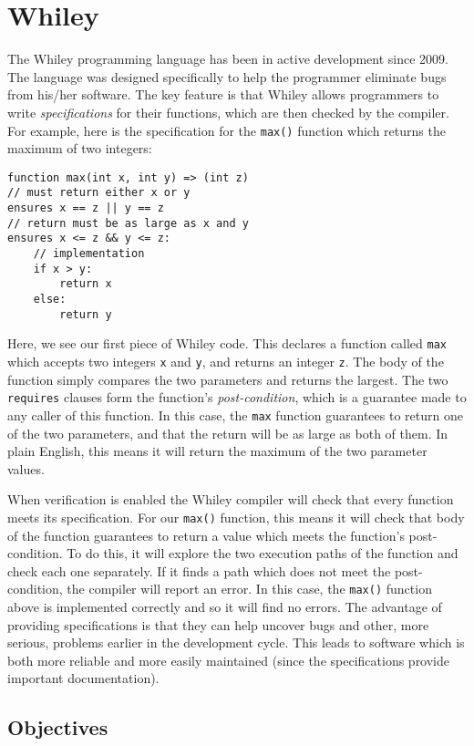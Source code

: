 \section{Whiley}
The Whiley programming language has been in active development since 2009.  The language was designed specifically to help the programmer eliminate bugs from his/her software.  The key feature is that Whiley allows programmers to write {\em specifications} for their functions, which are then checked by the compiler.  For example, here is the specification for the \lstinline{max()} function which returns the maximum of two integers:

\begin{lstlisting}
function max(int x, int y) => (int z)
// must return either x or y
ensures x == z || y == z
// return must be as large as x and y
ensures x <= z && y <= z:
    // implementation
    if x > y:
        return x
    else:
        return y
\end{lstlisting}

Here, we see our first piece of Whiley code.  This declares a function called \lstinline{max} which accepts two integers \lstinline{x} and \lstinline{y}, and returns an integer \lstinline{z}.  The body of the function simply compares the two parameters and returns the largest.
The two \lstinline{requires} clauses form the function's {\em post-condition}, which is a guarantee made to any caller of this function.  In this case, the \lstinline{max} function guarantees to return one of the two parameters, and that the return will be as large as both of them.  In plain English, this means it will return the maximum of the two parameter values.

When verification is enabled the Whiley compiler will check that every function meets its specification.  For our \lstinline{max()} function,
this means it will check that body of the function guarantees to return a value which meets the function's post-condition.  To do this, it will explore the two execution paths of the function and check each one separately.  If it finds a path which does not meet the post-condition, the compiler will report an error.  In this case, the \lstinline{max()} function above is implemented correctly and so it will find no errors.  The advantage of providing specifications is that they can help uncover bugs and other, more serious, problems earlier in the development cycle.  This leads to software which is both more reliable and more easily maintained (since the specifications provide important documentation).

\subsection{Objectives}
